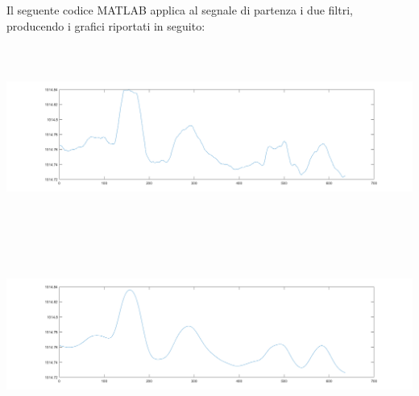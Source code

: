 \documentclass[a4paper, oneside]{book}
\begin{document}
Il seguente codice MATLAB applica al segnale di partenza i due filtri, producendo i grafici riportati in seguito: \\

\makebox[\linewidth]{}
\makebox[\linewidth]{}
\begin{minipage}{\linewidth}
\begin{center}
\includegraphics[width=160mm, height= 60mm]{./images/segnali/pressure_phone_movmean.png} 
\end{center}
\end{minipage}
\makebox[\linewidth]{}
\makebox[\linewidth]{}
\makebox[\linewidth]{}
\makebox[\linewidth]{}
\begin{minipage}{\linewidth}
\begin{center}
\includegraphics[width=160mm, height= 60mm]{./images/segnali/pressure_phone_gauss.png} 
\end{center}
\end{minipage}



\clearpage

\end{document}
